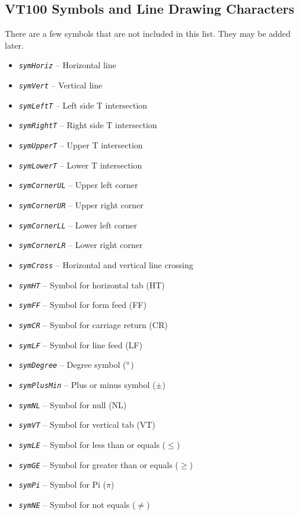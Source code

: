 \documentclass[10pt, openany]{book}
\newcommand{\constant}[1]{\emph{\texttt{#1}}}
\begin{document}
\subsection{VT100 Symbols and Line Drawing Characters}
There are a few symbols that are not included in this list.  They may be added later.
\begin{itemize}
  \item \constant{symHoriz} -- Horizontal line
  \item \constant{symVert} -- Vertical line
  \item \constant{symLeftT} -- Left side T intersection
  \item \constant{symRightT} -- Right side T intersection
  \item \constant{symUpperT} -- Upper T intersection
  \item \constant{symLowerT} -- Lower T intersection
  \item \constant{symCornerUL} -- Upper left corner
  \item \constant{symCornerUR} -- Upper right corner
  \item \constant{symCornerLL} -- Lower left corner
  \item \constant{symCornerLR} -- Lower right corner
  \item \constant{symCross} -- Horizontal and vertical line crossing
  \item \constant{symHT} -- Symbol for horizontal tab (HT)
  \item \constant{symFF} -- Symbol for form feed (FF)
  \item \constant{symCR} -- Symbol for carriage return (CR)
  \item \constant{symLF} -- Symbol for line feed (LF)
  \item \constant{symDegree} -- Degree symbol ($\degree$)
  \item \constant{symPlusMin} -- Plus or minus symbol ($\pm$)
  \item \constant{symNL} -- Symbol for null (NL)
  \item \constant{symVT} -- Symbol for vertical tab (VT)
  \item \constant{symLE} -- Symbol for less than or equals ($\leq$)
  \item \constant{symGE} -- Symbol for greater than or equals ($\geq$)
  \item \constant{symPi} -- Symbol for Pi ($\pi$)
  \item \constant{symNE} -- Symbol for not equals ($\neq$)
\end{itemize}
\end{document}
